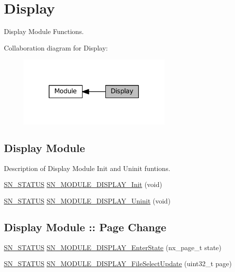 \hypertarget{group__MODULE__DISPLAY}{}\section{Display}
\label{group__MODULE__DISPLAY}


Display Module Functions.  


Collaboration diagram for Display\+:\nopagebreak
\begin{figure}[H]
\begin{center}
\leavevmode
\includegraphics[width=218pt]{group__MODULE__DISPLAY}
\end{center}
\end{figure}
\subsection*{Display Module}
\label{_amgrp9bc8c99c649c6c3f474df9cfdebdef93}%
Description of Display Module Init and Uninit funtions. \begin{DoxyCompactItemize}
\item 
\hyperlink{group__SYSTEM__ERROR_ga4540713b9a7a18ce44d78c3a10f7442f}{S\+N\+\_\+\+S\+T\+A\+T\+US} \hyperlink{group__MODULE__DISPLAY_ga894da8d8618a3c3b5bf2533a3a04622c}{S\+N\+\_\+\+M\+O\+D\+U\+L\+E\+\_\+\+D\+I\+S\+P\+L\+A\+Y\+\_\+\+Init} (void)
\item 
\hyperlink{group__SYSTEM__ERROR_ga4540713b9a7a18ce44d78c3a10f7442f}{S\+N\+\_\+\+S\+T\+A\+T\+US} \hyperlink{group__MODULE__DISPLAY_ga91f86811b5f4b83be3296c64ccd253ec}{S\+N\+\_\+\+M\+O\+D\+U\+L\+E\+\_\+\+D\+I\+S\+P\+L\+A\+Y\+\_\+\+Uninit} (void)
\end{DoxyCompactItemize}
\subsection*{Display Module \+:\+: Page Change}
\begin{DoxyCompactItemize}
\item 
\hyperlink{group__SYSTEM__ERROR_ga4540713b9a7a18ce44d78c3a10f7442f}{S\+N\+\_\+\+S\+T\+A\+T\+US} \hyperlink{group__MODULE__DISPLAY_ga91ef90fbda58e050514b22a2a564a82d}{S\+N\+\_\+\+M\+O\+D\+U\+L\+E\+\_\+\+D\+I\+S\+P\+L\+A\+Y\+\_\+\+Enter\+State} (nx\+\_\+page\+\_\+t state)
\item 
\hyperlink{group__SYSTEM__ERROR_ga4540713b9a7a18ce44d78c3a10f7442f}{S\+N\+\_\+\+S\+T\+A\+T\+US} \hyperlink{group__MODULE__DISPLAY_gabbde75c3e1a0fe4ffc14492a4e42931b}{S\+N\+\_\+\+M\+O\+D\+U\+L\+E\+\_\+\+D\+I\+S\+P\+L\+A\+Y\+\_\+\+File\+Select\+Update} (uint32\+\_\+t page)
\end{DoxyCompactItemize}
